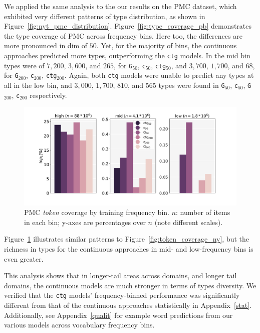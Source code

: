 \documentclass[11pt,a4paper]{article}
\begin{document}
We applied the same analysis to the our results on the PMC dataset, which exhibited very different patterns of type distribution, as shown in Figure~\ref{fig:nyt_pmc_distribution}. 
Figure~\ref{fig:type_coverage_pb} demonstrates the type coverage of PMC across frequency bins. Here too, the differences are more pronounced in dim of $50$. 
Yet, for the majority of bins, the continuous approaches predicted more types, outperforming the {\tt ctg} models. 
In the mid bin types were of $7,200$, $3,600$, and $265$, for {\tt G}$_{50}$, {\tt c}$_{50}$, {\tt ctg}$_{50}$, and $3,700$, $1,700$, and $68$, for {\tt G}$_{200}$, {\tt c}$_{200}$, {\tt ctg}$_{200}$. 
Again, both {\tt ctg} models were unable to predict any types at all in the low bin, and $3,000$, $1,700$, $810$, and $565$ types were found in {\tt G}$_{50}$, {\tt c}$_{50}$, {\tt G}$_{200}$, {\tt c}$_{200}$ respectively. 

\begin{figure}[h]
    \centering
    \includegraphics[width=0.47
    \textwidth]{fig/tokens_coverage_pb200.pdf}
    \caption{PMC \textit{token} coverage by training frequency bin. $n$: number of items in each bin; y-axes are percentages over $n$ (note different scales).}
    \vspace{-0.15in}
    \label{fig:token_coverage_pb}
\end{figure}

Figure~\ref{fig:token_coverage_pb} illustrates similar patterns to Figure~\ref{fig:token_coverage_ny}, but the richness in types for the continuous approaches in mid- and low-frequency bins is even greater.

This analysis shows that in longer-tail areas across domains, and longer tail domains, the continuous models are much stronger in terms of types diversity. 
We verified that the {\tt ctg} models' frequency-binned performance was significantly different from that of the continuous approaches statistically in Appendix~\ref{stat}. 
Additionally, see Appendix~\ref{qualit} for example word predictions from our various models across vocabulary frequency bins.  

\end{document}
